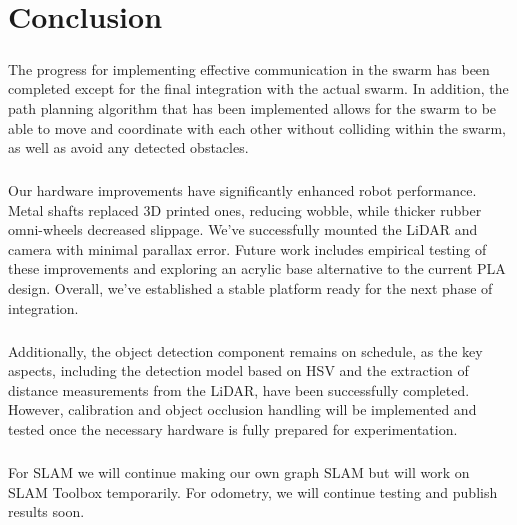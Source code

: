 \chapter{Conclusion}

\paragraph*{}
The progress for implementing effective communication in the swarm has been completed except for the final integration with the actual swarm. In addition, the path planning algorithm that has been implemented allows for the swarm to be able to move and coordinate with each other without colliding within the swarm, as well as avoid any detected obstacles.

\paragraph*{}
Our hardware improvements have significantly enhanced robot performance. Metal shafts replaced 3D printed ones, reducing wobble, while thicker rubber omni-wheels decreased slippage. We've successfully mounted the LiDAR and camera with minimal parallax error. Future work includes empirical testing of these improvements and exploring an acrylic base alternative to the current PLA design. Overall, we've established a stable platform ready for the next phase of integration.

\paragraph*{}
Additionally, the object detection component remains on schedule, as the key aspects, including the detection model based on HSV and the extraction of distance measurements from the LiDAR, have been successfully completed. However, calibration and object occlusion handling will be implemented and tested once the necessary hardware is fully prepared for experimentation.

\paragraph*{}
For SLAM we will continue making our own graph SLAM but will work on SLAM Toolbox temporarily. For odometry, we will continue testing and publish results soon.

